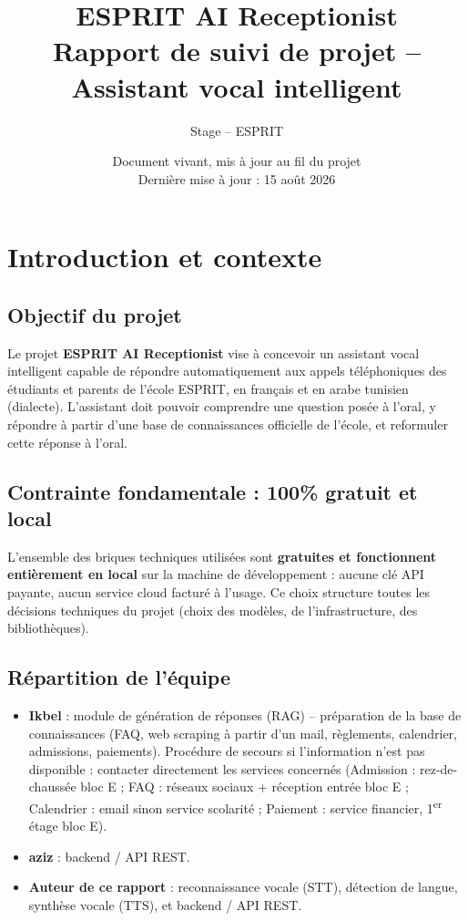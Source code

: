 \documentclass[11pt,a4paper]{report}
\title{\vspace{-2cm}\textbf{\Huge ESPRIT AI Receptionist}\\[0.3cm]\Large Rapport de suivi de projet -- Assistant vocal intelligent}
\author{Stage -- ESPRIT}
\date{Document vivant, mis à jour au fil du projet\\Dernière mise à jour : 15 août 2026}
\begin{document}
\maketitle
\tableofcontents

\chapter{Introduction et contexte}

\section{Objectif du projet}
Le projet \textbf{ESPRIT AI Receptionist} vise à concevoir un assistant vocal intelligent
capable de répondre automatiquement aux appels téléphoniques des étudiants et parents de
l'école ESPRIT, en français et en arabe tunisien (dialecte). L'assistant doit pouvoir
comprendre une question posée à l'oral, y répondre à partir d'une base de connaissances
officielle de l'école, et reformuler cette réponse à l'oral.

\section{Contrainte fondamentale : 100\% gratuit et local}
L'ensemble des briques techniques utilisées sont \textbf{gratuites et fonctionnent
entièrement en local} sur la machine de développement : aucune clé API payante, aucun
service cloud facturé à l'usage. Ce choix structure toutes les décisions techniques du
projet (choix des modèles, de l'infrastructure, des bibliothèques).

\section{Répartition de l'équipe}
\begin{itemize}[leftmargin=1.2cm]
    \item \textbf{Ikbel} : module de génération de réponses (RAG) -- préparation de la
    base de connaissances (FAQ, web scraping à partir d'un mail, règlements, calendrier,
    admissions, paiements). Procédure de secours si l'information n'est pas disponible :
    contacter directement les services concernés (Admission : rez-de-chaussée bloc E ;
    FAQ : réseaux sociaux + réception entrée bloc E ; Calendrier : email sinon service
    scolarité ; Paiement : service financier, 1\textsuperscript{er} étage bloc E).
    \item \textbf{aziz} : backend / API REST.
    \item \textbf{Auteur de ce rapport} : reconnaissance vocale (STT), détection de
    langue, synthèse vocale (TTS), et backend / API REST.
\end{itemize}
\end{document}

